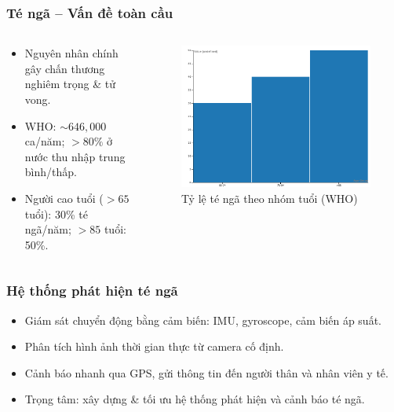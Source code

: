\begin{frame}
    \frametitle{Té ngã – Vấn đề toàn cầu}
    \begin{columns}[T]
        \begin{column}{0.48\textwidth}
            \begin{itemize}
                \item Nguyên nhân chính gây chấn thương nghiêm trọng \& tử vong.
                \item WHO: $\sim 646{,}000$ ca/năm; $>80\%$ ở nước thu nhập trung bình/thấp.
                \item Người cao tuổi ($>65$ tuổi): 30\% té ngã/năm; $>85$ tuổi: 50\%.
            \end{itemize}
        \end{column}
        \begin{column}{0.48\textwidth}
            \begin{figure}
                \centering
                \includegraphics[width=\textwidth]{images/fall_status_who.png}
                \caption{Tỷ lệ té ngã theo nhóm tuổi (WHO)}
            \end{figure}
        \end{column}
    \end{columns}
\end{frame}

\begin{frame}
    \frametitle{Hệ thống phát hiện té ngã}
    \begin{itemize}
        \item Giám sát chuyển động bằng cảm biến: IMU, gyroscope, cảm biến áp suất.
        \item Phân tích hình ảnh thời gian thực từ camera cố định.
        \item Cảnh báo nhanh qua GPS, gửi thông tin đến người thân và nhân viên y tế.
        \item Trọng tâm: xây dựng \& tối ưu hệ thống phát hiện và cảnh báo té ngã.
    \end{itemize}
\end{frame}


